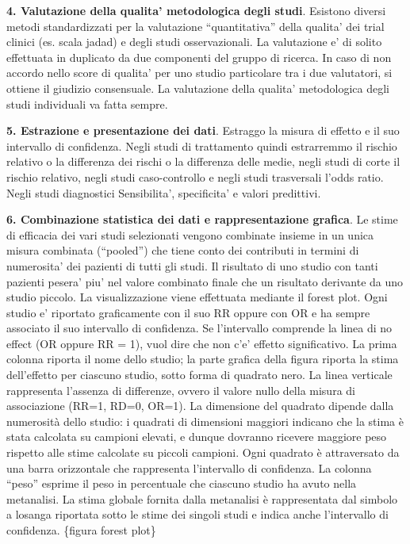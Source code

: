 \documentclass[]{book}
\begin{document}
\textbf{4. Valutazione della qualita' metodologica degli studi}. Esistono diversi metodi standardizzati per la valutazione ``quantitativa'' della qualita' dei trial clinici (es. scala jadad) e degli studi osservazionali. La valutazione e' di solito effettuata in duplicato da due componenti del gruppo di ricerca. In caso di non accordo nello score di qualita' per uno studio particolare tra i due valutatori, si ottiene il giudizio consensuale. La valutazione della qualita' metodologica degli studi individuali va fatta sempre.

\textbf{5. Estrazione e presentazione dei dati}. Estraggo la misura di effetto e il suo intervallo di confidenza. Negli studi di trattamento quindi estrarremmo il rischio relativo o la differenza dei rischi o la differenza delle medie, negli studi di corte il rischio relativo, negli studi caso-controllo e negli studi trasversali l'odds ratio. Negli studi diagnostici Sensibilita', specificita' e valori predittivi.

\textbf{6. Combinazione statistica dei dati e rappresentazione grafica}. Le stime di efficacia dei vari studi selezionati vengono combinate insieme in un unica misura combinata (``pooled'') che tiene conto dei contributi in termini di numerosita' dei pazienti di tutti gli studi. Il risultato di uno studio con tanti pazienti pesera' piu' nel valore combinato finale che un risultato derivante da uno studio piccolo.
La visualizzazione viene effettuata mediante il forest plot. Ogni studio e' riportato graficamente con il suo RR oppure con OR e ha sempre associato il suo intervallo di confidenza. Se l'intervallo comprende la linea di no effect (OR oppure RR = 1), vuol dire che non c'e' effetto significativo. La prima colonna riporta il nome dello studio; la parte grafica della figura riporta la stima dell'effetto per ciascuno studio, sotto forma di quadrato nero. La linea verticale rappresenta l'assenza di differenze, ovvero il valore nullo della misura di associazione (RR=1, RD=0, OR=1). La dimensione del quadrato dipende dalla numerosità dello studio: i quadrati di dimensioni maggiori indicano che la stima è stata calcolata su campioni elevati, e dunque dovranno ricevere maggiore peso rispetto alle stime calcolate su piccoli campioni. Ogni quadrato è attraversato da una barra orizzontale che rappresenta l'intervallo di confidenza. La colonna ``peso'' esprime il peso in percentuale che ciascuno studio ha avuto nella metanalisi. La stima globale fornita dalla metanalisi è rappresentata dal simbolo a losanga riportata sotto le stime dei singoli studi e indica anche l'intervallo di confidenza.
\{figura forest plot\}
\end{document}
